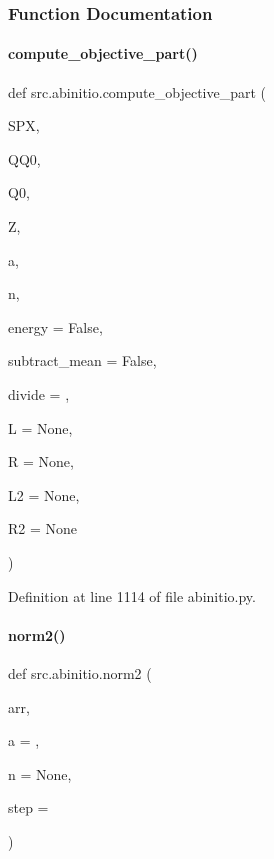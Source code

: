 \subsubsection{Function Documentation}
\mbox{\label{namespacesrc_1_1abinitio_ace4aca44aab54100556205a5aeab3cad}} 
\paragraph{\texorpdfstring{compute\+\_\+objective\+\_\+part()}{compute\_objective\_part()}}
{\footnotesize\ttfamily def src.\+abinitio.\+compute\+\_\+objective\+\_\+part (\begin{DoxyParamCaption}\item[{}]{S\+PX,  }\item[{}]{Q\+Q0,  }\item[{}]{Q0,  }\item[{}]{Z,  }\item[{}]{a,  }\item[{}]{n,  }\item[{}]{energy = {\ttfamily False},  }\item[{}]{subtract\+\_\+mean = {\ttfamily False},  }\item[{}]{divide = {},  }\item[{}]{L = {\ttfamily None},  }\item[{}]{R = {\ttfamily None},  }\item[{}]{L2 = {\ttfamily None},  }\item[{}]{R2 = {\ttfamily None} }\end{DoxyParamCaption})}



Definition at line 1114 of file abinitio.\+py.

\mbox{\label{namespacesrc_1_1abinitio_ae5e4372a8a2b6ae643c954f1717761a5}} 
\paragraph{\texorpdfstring{norm2()}{norm2()}}
{\footnotesize\ttfamily def src.\+abinitio.\+norm2 (\begin{DoxyParamCaption}\item[{}]{arr,  }\item[{}]{a = {},  }\item[{}]{n = {\ttfamily None},  }\item[{}]{step = {} }\end{DoxyParamCaption})}



